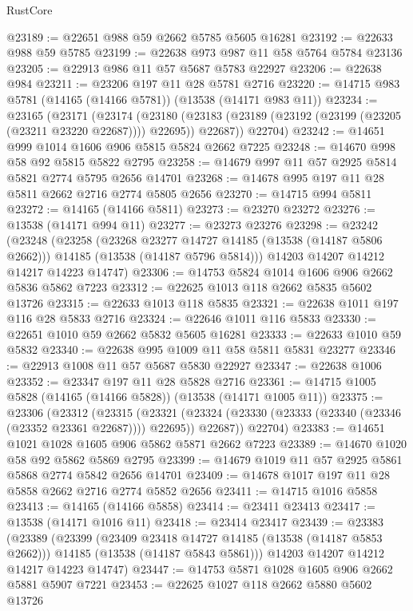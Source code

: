 \begin{lexlean}{RustCore}
\begin{coremodule}
@23189 := @22651 @988 @59 @2662 @5785 @5605 @16281
@23192 := @22633 @988 @59 @5785
@23199 := @22638 @973 @987 @11 @58 @5764 @5784 @23136
@23205 := @22913 @986 @11 @57 @5687 @5783 @22927
@23206 := @22638 @984
@23211 := @23206 @197 @11 @28 @5781 @2716
@23220 := @14715 @983 @5781 (@14165 (@14166 @5781)) (@13538 (@14171 @983 @11))
@23234 := @23165
    (@23171
      (@23174
        (@23180 (@23183 (@23189 (@23192 (@23199 (@23205 (@23211 @23220 @22687)))) @22695)) @22687))
      @22704)
@23242 := @14651 @999 @1014 @1606 @906 @5815 @5824 @2662 @7225
@23248 := @14670 @998 @58 @92 @5815 @5822 @2795
@23258 := @14679 @997 @11 @57 @2925 @5814 @5821 @2774 @5795 @2656 @14701
@23268 := @14678 @995 @197 @11 @28 @5811 @2662 @2716 @2774 @5805 @2656
@23270 := @14715 @994 @5811
@23272 := @14165 (@14166 @5811)
@23273 := @23270 @23272
@23276 := @13538 (@14171 @994 @11)
@23277 := @23273 @23276
@23298 := @23242
    (@23248
      (@23258
        (@23268 @23277 @14727 @14185 (@13538 (@14187 @5806 @2662)))
        @14185
        (@13538 (@14187 @5796 @5814)))
      @14203
      @14207
      @14212
      @14217
      @14223
      @14747)
@23306 := @14753 @5824 @1014 @1606 @906 @2662 @5836 @5862 @7223
@23312 := @22625 @1013 @118 @2662 @5835 @5602 @13726
@23315 := @22633 @1013 @118 @5835
@23321 := @22638 @1011 @197 @116 @28 @5833 @2716
@23324 := @22646 @1011 @116 @5833
@23330 := @22651 @1010 @59 @2662 @5832 @5605 @16281
@23333 := @22633 @1010 @59 @5832
@23340 := @22638 @995 @1009 @11 @58 @5811 @5831 @23277
@23346 := @22913 @1008 @11 @57 @5687 @5830 @22927
@23347 := @22638 @1006
@23352 := @23347 @197 @11 @28 @5828 @2716
@23361 := @14715 @1005 @5828 (@14165 (@14166 @5828)) (@13538 (@14171 @1005 @11))
@23375 := @23306
    (@23312
      (@23315
        (@23321 (@23324 (@23330 (@23333 (@23340 (@23346 (@23352 @23361 @22687)))) @22695)) @22687))
      @22704)
@23383 := @14651 @1021 @1028 @1605 @906 @5862 @5871 @2662 @7223
@23389 := @14670 @1020 @58 @92 @5862 @5869 @2795
@23399 := @14679 @1019 @11 @57 @2925 @5861 @5868 @2774 @5842 @2656 @14701
@23409 := @14678 @1017 @197 @11 @28 @5858 @2662 @2716 @2774 @5852 @2656
@23411 := @14715 @1016 @5858
@23413 := @14165 (@14166 @5858)
@23414 := @23411 @23413
@23417 := @13538 (@14171 @1016 @11)
@23418 := @23414 @23417
@23439 := @23383
    (@23389
      (@23399
        (@23409 @23418 @14727 @14185 (@13538 (@14187 @5853 @2662)))
        @14185
        (@13538 (@14187 @5843 @5861)))
      @14203
      @14207
      @14212
      @14217
      @14223
      @14747)
@23447 := @14753 @5871 @1028 @1605 @906 @2662 @5881 @5907 @7221
@23453 := @22625 @1027 @118 @2662 @5880 @5602 @13726

\end{coremodule}
\end{lexlean}
